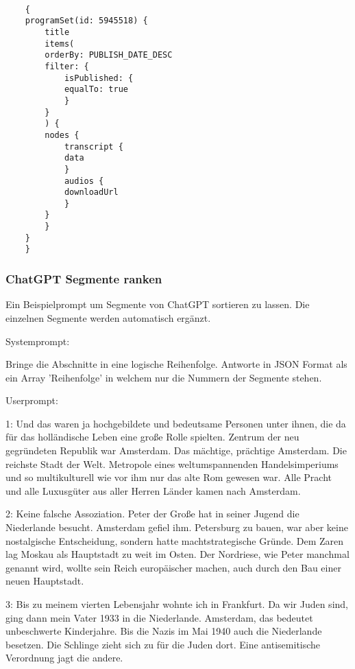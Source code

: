 \begin{verbatim}

    {
    programSet(id: 5945518) {
        title
        items(
        orderBy: PUBLISH_DATE_DESC
        filter: {
            isPublished: {
            equalTo: true
            }
        }
        ) {
        nodes {
            transcript {
            data
            }
            audios {
            downloadUrl
            }
        }
        }
    }
    }
\end{verbatim}

\label{ch:chatgpt-reranking}

\subsubsection*{ChatGPT Segmente ranken}

Ein Beispielprompt um Segmente von ChatGPT sortieren zu lassen.
Die einzelnen Segmente werden automatisch ergänzt.

Systemprompt:
\begin{itshape}
    Bringe die Abschnitte in eine logische Reihenfolge.
    Antworte in JSON Format als ein Array 'Reihenfolge' in welchem nur die Nummern der Segmente stehen.
\end{itshape}

Userprompt:

\begin{itshape}
    1: Und das waren ja hochgebildete und bedeutsame Personen unter ihnen, die da für das holländische Leben eine große Rolle spielten. Zentrum der neu gegründeten Republik war Amsterdam. Das mächtige, prächtige Amsterdam. Die reichste Stadt der Welt. Metropole eines weltumspannenden Handelsimperiums und so multikulturell wie vor ihm nur das alte Rom gewesen war. Alle Pracht und alle Luxusgüter aus aller Herren Länder kamen nach Amsterdam.
    
    2: Keine falsche Assoziation. Peter der Große hat in seiner Jugend die Niederlande besucht. Amsterdam gefiel ihm. Petersburg zu bauen, war aber keine nostalgische Entscheidung, sondern hatte machtstrategische Gründe. Dem Zaren lag Moskau als Hauptstadt zu weit im Osten. Der Nordriese, wie Peter manchmal genannt wird, wollte sein Reich europäischer machen, auch durch den Bau einer neuen Hauptstadt.
    
    3: Bis zu meinem vierten Lebensjahr wohnte ich in Frankfurt. Da wir Juden sind, ging dann mein Vater 1933 in die Niederlande. Amsterdam, das bedeutet unbeschwerte Kinderjahre. Bis die Nazis im Mai 1940 auch die Niederlande besetzen. Die Schlinge zieht sich zu für die Juden dort. Eine antisemitische Verordnung jagt die andere.
\end{itshape}

